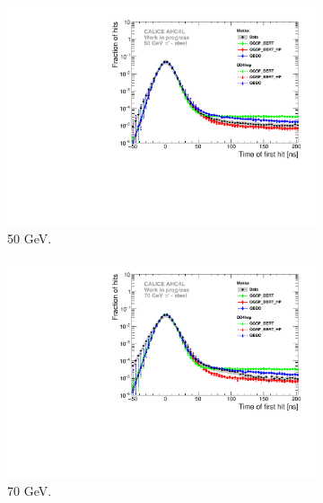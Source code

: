 \begin{figure}[htbp!]
\begin{subfigure}[t]{0.5\textwidth}
		\includegraphics[width=1\textwidth]{../Thesis_Plots/Timing/Pions/Plots/Comparison_SimData_Pion50GeV_LateClusters.pdf}
		\caption{50 GeV.} \label{fig:dNdt_SimData_50GeV}
	\end{subfigure}
	\hfill
	\begin{subfigure}[t]{0.5\textwidth}
		\centering
		\includegraphics[width=1\textwidth]{../Thesis_Plots/Timing/Pions/Plots/Comparison_SimData_Pion70GeV_LateClusters.pdf}
		\caption{70 GeV.} \label{fig:dNdt_SimData_70GeV}
	\end{subfigure}
	\hfill
	\begin{subfigure}[t]{0.5\textwidth}
		\centering

\end{subfigure}
\end{figure}
